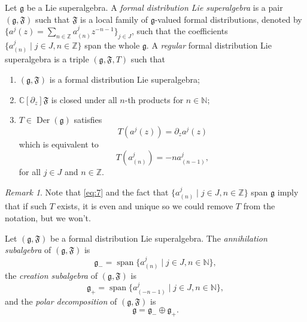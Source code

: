 \documentclass[a4paper, 12pt, reqno]{amsart}
\theoremstyle{remark}
\newtheorem{remark}[theorem]{Remark}
\numberwithin{equation}{subsection}
\DeclareMathOperator{\vspan}{span}
\DeclareMathOperator{\Der}{Der}
\begin{document}
Let $\mathfrak{g}$ be a Lie superalgebra.
A \emph{formal distribution Lie superalgebra} is a pair $(\mathfrak{g}, \mathfrak{F})$ such that $\mathfrak{F}$ is a local family of $\mathfrak{g}$-valued formal distributions, denoted by $\{a^j(z) = \sum_{n \in \mathbb{Z}}a^j_{(n)}z^{-n - 1}\}_{j \in J}$, such that the coefficients $\{a^j_{(n)} \mid j \in J, n \in \mathbb{Z}\}$ span the whole $\mathfrak{g}$.
A \emph{regular} formal distribution Lie superalgebra is a triple $(\mathfrak{g}, \mathfrak{F}, T)$ such that
\begin{enumerate}
\item $(\mathfrak{g}, \mathfrak{F})$ is a formal distribution Lie superalgebra;
\item $\mathbb{C}[\partial_z]\mathfrak{F}$ is closed under all $n$-th products for $n \in \mathbb{N}$;
\item $T \in \Der(\mathfrak{g})$ satisfies
  \begin{equation*}
    T(a^j(z)) = \partial_za^j(z)
  \end{equation*}
  which is equivalent to
  \begin{equation}
    \label{eq:7}
    T(a^j_{(n)}) = -na^j_{(n - 1)},
  \end{equation}
  for all $j \in J$ and $n \in \mathbb{Z}$. 
\end{enumerate}
\begin{remark}
  \label{rmk:4}
  Note that \eqref{eq:7} and the fact that $\{a^j_{(n)} \mid j \in J, n \in \mathbb{Z}\}$ span $\mathfrak{g}$ imply that if such $T$ exists, it is even and unique so we could remove $T$ from the notation, but we won't.
\end{remark}

Let $(\mathfrak{g}, \mathfrak{F})$ be a formal distribution Lie superalgebra.
The \emph{annihilation subalgebra} of $(\mathfrak{g}, \mathfrak{F})$ is
\begin{equation*}
  \mathfrak{g}_- = \vspan\{a^j_{(n)} \mid j \in J, n \in \mathbb{N}\},
\end{equation*}
the \emph{creation subalgebra} of $(\mathfrak{g}, \mathfrak{F})$ is
\begin{equation*}
  \mathfrak{g}_+ = \vspan\{a^j_{(-n - 1)} \mid j \in J, n \in \mathbb{N}\},
\end{equation*}
and the \emph{polar decomposition} of $(\mathfrak{g}, \mathfrak{F})$ is
\begin{equation*}
  \mathfrak{g} = \mathfrak{g}_- \oplus \mathfrak{g}_+.
\end{equation*}
\end{document}
